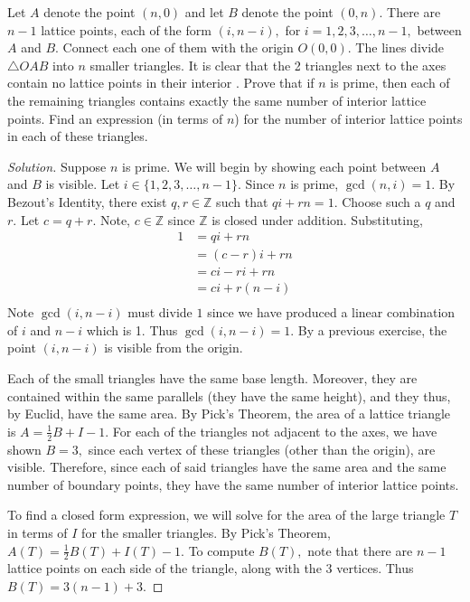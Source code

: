 \documentclass[12pt]{article}
\newcommand{\Z}{\mathbb{Z}}
\newenvironment{exercise}[2][Exercise]{\begin{trivlist}
        \item[\hskip \labelsep {\bfseries #1}\hskip \labelsep {\bfseries #2.}]}{\end{trivlist}}
\newenvironment{solution}
        {\begin{proof}[Solution]}
                    {\end{proof}}
\begin{document}
\begin{exercise}{76}
    Let \( A \) denote the point \( (n,0) \) and let \( B \) denote the point \( (0, n) . \) There are \( n-1 \) lattice points, each of the form \( (i,n-i), \) for \( i = 1,2,3, \dots ,n-1, \) between \( A \) and \( B \). Connect each one of them with the origin \( O (0,0) . \) The lines divide \( \triangle OAB \) into \( n \) smaller triangles. It is clear that the 2 triangles next to the axes contain no lattice points in their interior . Prove that if \( n \) is prime, then each of the remaining triangles contains exactly the same number of interior lattice points. Find an expression (in terms of \( n \)) for the number of interior lattice points in each of these triangles.
    \begin{solution}
        Suppose \( n \) is prime. We will begin by showing each point between \( A \) and \( B \) is visible. Let \( i \in \{1,2,3, \dots , n-1\} . \) Since \( n \) is prime, \( \gcd(n, i) = 1. \) By Bezout's Identity, there exist \( q,r \in \Z \) such that \( qi + rn = 1. \) Choose such a \( q \) and \( r \). Let \( c = q + r. \) Note, \( c \in \Z \) since \( \Z \) is closed under addition. Substituting,
        \begin{align*}
            1 &= qi + rn \\
            &= (c-r) i + rn\\
            &= ci - ri + rn \\
            &= ci + r (n-i) \\
        \end{align*}
        Note \( \gcd(i, n-i) \) must divide \( 1 \) since we have produced a linear combination of \( i \) and \( n-i \) which is 1. Thus \( \gcd(i,n-i) = 1. \) By a previous exercise, the point \( (i,n-i) \) is visible from the origin.

        Each of the small triangles have the same base length. Moreover, they are contained within the same parallels (they have the same height), and they thus, by Euclid, have the same area. By Pick's Theorem, the area of a lattice triangle is \( A = \frac{1}{2} B + I -1. \) For each of the triangles not adjacent to the axes, we have shown \( B = 3, \) since each vertex of these triangles (other than the origin), are visible. Therefore, since each of said triangles have the same area and the same number of boundary points, they have the same number of interior lattice points.

        To find a closed form expression, we will solve for the area of the large triangle \( T \) in terms of \( I \) for the smaller triangles. By Pick's Theorem, \( A(T) = \frac{1}{2} B(T) + I(T) -1. \) To compute \( B(T) , \) note that there are \( n-1 \) lattice points on each side of the triangle, along with the 3 vertices. Thus \( B(T) = 3(n-1) + 3. \)


\end{solution}
\end{exercise}
\end{document}
